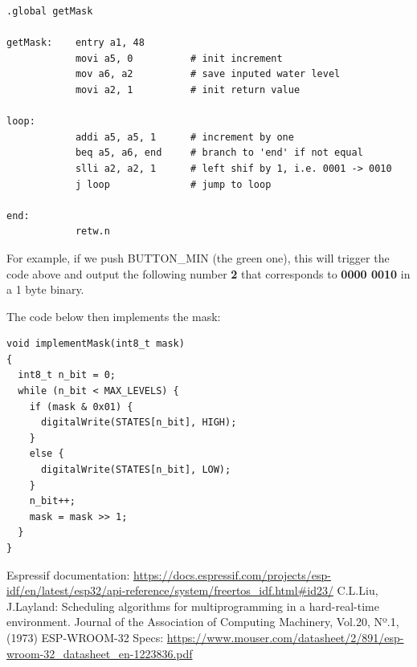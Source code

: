 \documentclass[11pt]{article}
\begin{document}
\begin{verbatim}
.global getMask

getMask:    entry a1, 48
            movi a5, 0          # init increment
            mov a6, a2          # save inputed water level
            movi a2, 1          # init return value

loop: 
            addi a5, a5, 1      # increment by one
            beq a5, a6, end     # branch to 'end' if not equal
            slli a2, a2, 1      # left shif by 1, i.e. 0001 -> 0010
            j loop              # jump to loop 

end:
            retw.n
\end{verbatim}

For example, if we push BUTTON\_MIN (the green one), this will trigger the code above and output the following number \textbf{2} that corresponds to \textbf{0000 0010} in a 1 byte binary. 

The code below then implements the mask:

\begin{verbatim}
void implementMask(int8_t mask)
{
  int8_t n_bit = 0;
  while (n_bit < MAX_LEVELS) {
    if (mask & 0x01) {
      digitalWrite(STATES[n_bit], HIGH);
    }
    else {
      digitalWrite(STATES[n_bit], LOW);
    }
    n_bit++;
    mask = mask >> 1;
  }
}
\end{verbatim}

\newpage
\begin{thebibliography}{8}

 Espressif documentation: {\url{https://docs.espressif.com/projects/esp-idf/en/latest/esp32/api-reference/system/freertos_idf.html#id23/}}
  C.L.Liu, J.Layland: Scheduling algorithms for multiprogramming in a hard-real-time environment. Journal of the Association of Computing Machinery, Vol.20, Nº.1, (1973)
 ESP-WROOM-32 Specs:  {\url{https://www.mouser.com/datasheet/2/891/esp-wroom-32_datasheet_en-1223836.pdf}}

\end{thebibliography}
\end{document}
